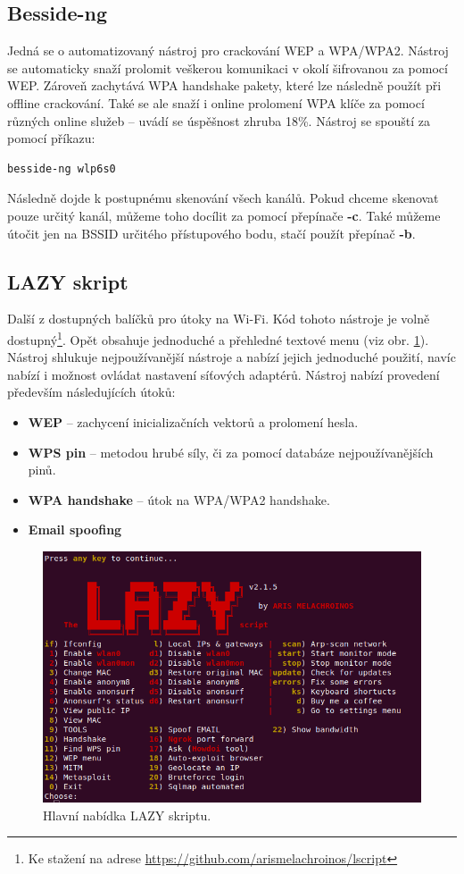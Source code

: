 \subsection{Besside-ng}
Jedná se o automatizovaný nástroj pro crackování WEP a WPA/WPA2. Nástroj se automaticky snaží prolomit veškerou komunikaci v okolí šifrovanou za pomocí WEP. Zároveň zachytává WPA handshake pakety, které lze následně použít při offline crackování. Také se ale snaží i online prolomení WPA klíče za pomocí různých online služeb -- uvádí se úspěšnost zhruba 18\%. Nástroj se spouští za pomocí příkazu:
\begin{lstlisting}[language=bash]
besside-ng wlp6s0
\end{lstlisting}
Následně dojde k postupnému skenování všech kanálů. Pokud chceme skenovat pouze určitý kanál, můžeme toho docílit za pomocí přepínače \textbf{-c}. Také můžeme útočit jen na BSSID určitého přístupového bodu, stačí použít přepínač \textbf{-b}.

\subsection{LAZY skript}
Další z dostupných balíčků pro útoky na Wi-Fi. Kód tohoto nástroje je volně dostupný\footnote{Ke stažení na adrese \url{https://github.com/arismelachroinos/lscript}}. Opět obsahuje jednoduché a přehledné textové menu (viz obr. \ref{img:lazy}). Nástroj shlukuje nejpoužívanější nástroje a nabízí jejich jednoduché použití, navíc nabízí i možnost ovládat nastavení síťových adaptérů. Nástroj nabízí provedení především následujících útoků:
\begin{itemize}
  \item{\textbf{WEP} -- zachycení inicializačních vektorů a prolomení hesla.}
  \item{\textbf{WPS pin} -- metodou hrubé síly, či za pomocí databáze nejpoužívanějších pinů.}
  \item{\textbf{WPA handshake} -- útok na WPA/WPA2 handshake.}
  \item{\textbf{Email spoofing}}
\end{itemize}

\begin{figure}[htbp]
  \centering
  \includegraphics[width=14.7cm]{obrazky-figures/lazy.png}
  \caption{Hlavní nabídka LAZY skriptu.}
  \label{img:lazy}
\end{figure}

